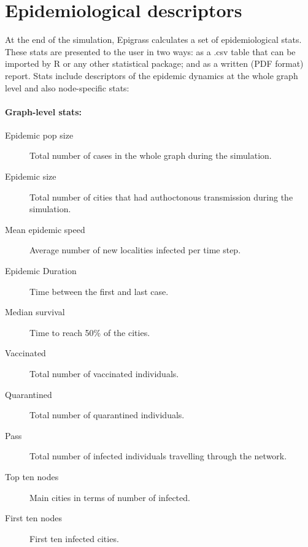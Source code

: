 \section{Epidemiological descriptors}
At the end of the simulation, Epigrass calculates a set of epidemiological stats. These stats are presented to the user in two ways: as a .csv table that can be imported by R or any other statistical package; and as a written (PDF format) report.  Stats include descriptors of the epidemic dynamics at the whole graph level and also node-specific stats:
\paragraph*{Graph-level stats:}
\begin{description}
\item[Epidemic pop size] Total number of cases in the whole graph during the simulation. 
\item[Epidemic size] Total number of cities that had authoctonous transmission during the simulation. 
\item[Mean epidemic speed] Average number of new localities infected per time step.
\item[Epidemic Duration] Time between the first and last case.
\item[Median survival] Time to reach 50\% of the cities.
\item[Vaccinated] Total number of vaccinated individuals.
\item[Quarantined] Total number of quarantined individuals.
\item[Pass] Total number of infected individuals travelling through the network.
\item[Top ten nodes] Main cities in terms of number of infected.
\item[First ten nodes] First ten infected cities.
\end{description}

